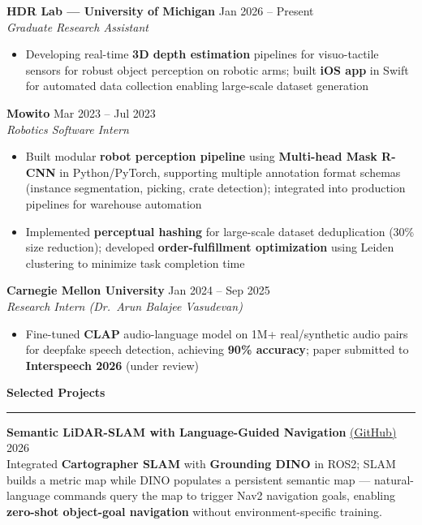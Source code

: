 \documentclass[9pt]{article}
\newcommand{\sect}[1]{\vspace{4pt}\noindent\textbf{\large #1}\vspace{3pt}\hrule\vspace{6pt}}
\begin{document}
\vspace{-1mm}
\textbf{HDR Lab --- University of Michigan} \hfill Jan 2026 -- Present\\
\emph{Graduate Research Assistant}
\vspace{-2mm}
\begin{itemize}[leftmargin=*,noitemsep,topsep=1pt]
  \item Developing real-time \textbf{3D depth estimation} pipelines for visuo-tactile sensors for robust object perception on robotic arms; built \textbf{iOS app} in Swift for automated data collection enabling large-scale dataset generation
\end{itemize}

\vspace{-1mm}
\textbf{Mowito} \hfill Mar 2023 -- Jul 2023\\
\emph{Robotics Software Intern}
\vspace{-2mm}
\begin{itemize}[leftmargin=*,noitemsep,topsep=1pt]
  \item Built modular \textbf{robot perception pipeline} using \textbf{Multi-head Mask R-CNN} in Python/PyTorch, supporting multiple annotation format schemas (instance segmentation, picking, crate detection); integrated into production pipelines for warehouse automation
  \item Implemented \textbf{perceptual hashing} for large-scale dataset deduplication (30\% size reduction); developed \textbf{order-fulfillment optimization} using Leiden clustering to minimize task completion time
\end{itemize}

\vspace{-1mm}
\textbf{Carnegie Mellon University} \hfill Jan 2024 -- Sep 2025\\
\emph{Research Intern (Dr.\ Arun Balajee Vasudevan)}
\vspace{-2mm}
\begin{itemize}[leftmargin=*,noitemsep,topsep=1pt]
  \item Fine-tuned \textbf{CLAP} audio-language model on 1M+ real/synthetic audio pairs for deepfake speech detection, achieving \textbf{90\% accuracy}; paper submitted to \textbf{Interspeech 2026} (under review)
\end{itemize}

\sect{Selected Projects}

\textbf{Semantic LiDAR-SLAM with Language-Guided Navigation} \href{https://github.com/chittinvarunav/VLSGN_ROB530-Team21}{(GitHub)} \hfill 2026\\
Integrated \textbf{Cartographer SLAM} with \textbf{Grounding DINO} in ROS2; SLAM builds a metric map while DINO populates a persistent semantic map --- natural-language commands query the map to trigger Nav2 navigation goals, enabling \textbf{zero-shot object-goal navigation} without environment-specific training.
\end{document}
